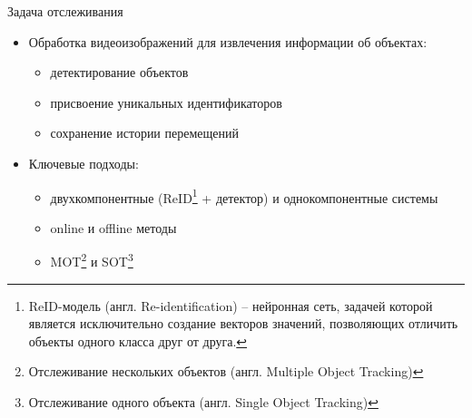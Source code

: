 \documentclass{beamer} %
\begin{document}
\begin{frame}{Задача отслеживания}
  \begin{itemize}
    \item Обработка видеоизображений для извлечения информации об объектах:
      \begin{itemize}
        \item детектирование объектов
        \item присвоение уникальных идентификаторов
        \item сохранение истории перемещений
      \end{itemize}
    \item Ключевые подходы:
      \begin{itemize}
        \item двухкомпонентные (ReID\footnote{ReID-модель (англ. Re-identification) -- нейронная сеть, задачей которой является исключительно создание векторов значений, позволяющих отличить объекты одного класса друг от друга.} + детектор) и однокомпонентные системы
        \item online и offline методы
        \item MOT\footnote{Отслеживание нескольких объектов (англ. Multiple Object Tracking)} и SOT\footnote{Отслеживание одного объекта (англ. Single Object Tracking)}
      \end{itemize}

  \end{itemize}
\end{frame}

\end{document}
